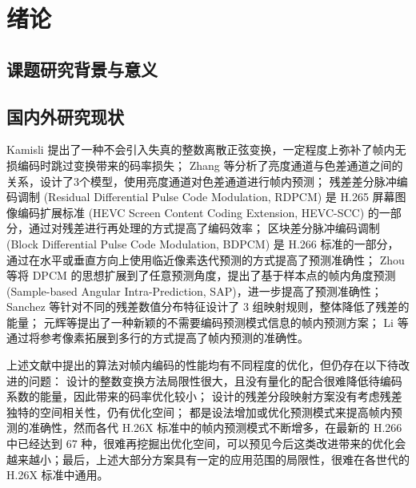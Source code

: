\chapter{绪论}
\label{cha:c1}

\section{课题研究背景与意义}

\section{国内外研究现状}
Kamisli 提出了一种不会引入失真的整数离散正弦变换，一定程度上弥补了帧内无损编码时跳过变换带来的码率损失；
Zhang 等分析了亮度通道与色差通道之间的关系，设计了3个模型，使用亮度通道对色差通道进行帧内预测；
残差差分脉冲编码调制 (Residual Differential Pulse Code Modulation, RDPCM) 是 H.265 屏幕图像编码扩展标准 (HEVC Screen Content Coding Extension, HEVC-SCC) 的一部分，通过对残差进行再处理的方式提高了编码效率；
区块差分脉冲编码调制 (Block Differential Pulse Code Modulation, BDPCM) 是 H.266 标准的一部分，通过在水平或垂直方向上使用临近像素迭代预测的方式提高了预测准确性；
Zhou 等将 DPCM 的思想扩展到了任意预测角度，提出了基于样本点的帧内角度预测 (Sample-based Angular Intra-Prediction, SAP)，进一步提高了预测准确性；
Sanchez 等针对不同的残差数值分布特征设计了 3 组映射规则，整体降低了残差的能量；
元辉等提出了一种新颖的不需要编码预测模式信息的帧内预测方案；
Li 等通过将参考像素拓展到多行的方式提高了帧内预测的准确性。

上述文献中提出的算法对帧内编码的性能均有不同程度的优化，但仍存在以下待改进的问题：\cite{LosslessI2ITransformTCSVT} 设计的整数变换方法局限性很大，且没有量化的配合很难降低待编码系数的能量，因此带来的码率优化较小；\cite{pwmResidualsPiecewiseMapping,HEVCSCCOverview} 设计的残差分段映射方案没有考虑残差独特的空间相关性，仍有优化空间；\cite{CrossComponentPredictionCCLM,SAP-SAP1,SAP-SAPHVSWP2DTM,pwmResidualsPiecewiseMapping,XiDianIntraPredictionH264,EfficientMultiplelinebasedIntra} 都是设法增加或优化预测模式来提高帧内预测的准确性，然而各代 H.26X 标准中的帧内预测模式不断增多，在最新的 H.266 中已经达到 67 种，很难再挖掘出优化空间，可以预见今后这类改进带来的优化会越来越小；最后，上述大部分方案具有一定的应用范围的局限性，很难在各世代的 H.26X 标准中通用。


